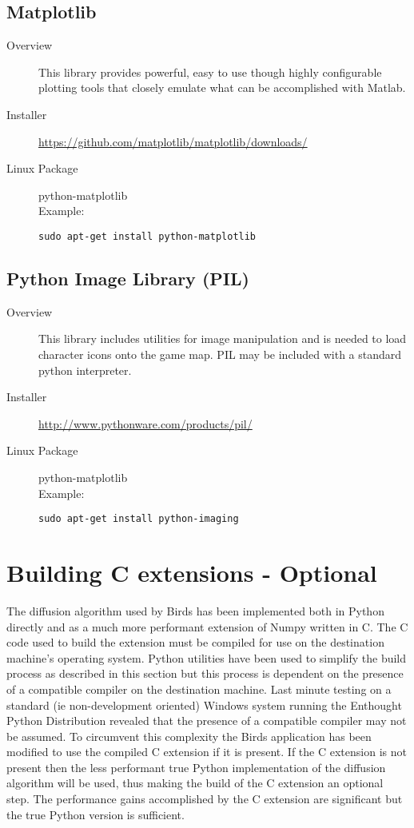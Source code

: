 \documentclass[a4paper,10pt]{article}
\begin{document}
\subsection{Matplotlib} 
\begin{description}
\item[Overview]This library provides powerful, easy to use though highly configurable plotting tools that closely emulate what can be accomplished with Matlab.
\item[Installer] \url{https://github.com/matplotlib/matplotlib/downloads/}
\item[Linux Package] python-matplotlib \\ Example: \begin{verbatim}sudo apt-get install python-matplotlib\end{verbatim}

\end{description}


\subsection{Python Image Library (PIL)} 
\begin{description}
\item[Overview] This library includes utilities for image manipulation and is needed to load character icons onto the game map.  PIL may be included with a standard python interpreter.
\item[Installer] \url{http://www.pythonware.com/products/pil/}
\item[Linux Package] python-matplotlib \\ Example: \begin{verbatim}sudo apt-get install python-imaging\end{verbatim}

\end{description}
\pagebreak

\section{Building C extensions - Optional}
The diffusion algorithm used by Birds has been implemented both in Python directly and as a much more performant extension of Numpy written in C.  The C code used to build the extension must be compiled for use on the destination machine's operating system.  Python utilities have been used to simplify the build process as described in this section but this process is dependent on the presence of a compatible compiler on the destination machine.  Last minute testing on a standard (ie non-development oriented) Windows system running the Enthought Python Distribution revealed that the presence of a compatible compiler may not be assumed.  To circumvent this complexity the Birds application has been modified to use the compiled C extension if it is present.  If the C extension is not present then the less performant true Python implementation of the diffusion algorithm will be used, thus making the build of the C extension an optional step.  The performance gains accomplished by the C extension are significant 
but the true Python version is sufficient.
\end{document}
